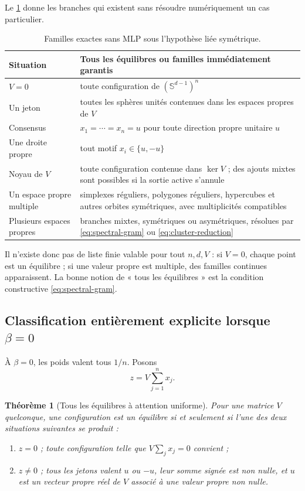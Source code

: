 \documentclass[11pt,a4paper]{article}
\newtheorem{theorem}{Théorème}[section]
\theoremstyle{definition}
\newcommand{\sphere}{\mathbb S}
\begin{document}
Le \cref{tab:families} donne les branches qui existent sans résoudre numériquement un
cas particulier.

\begin{table}[ht]
\centering
\caption{Familles exactes sans MLP sous l'hypothèse liée symétrique.}
\label{tab:families}
\begin{tabularx}{\textwidth}{@{}lX@{}}
\toprule
Situation & Tous les équilibres ou familles immédiatement garantis \\
\midrule
$V=0$ & toute configuration de $(\sphere^{d-1})^n$ \\
Un jeton & toutes les sphères unités contenues dans les espaces propres de $V$ \\
Consensus & $x_1=\cdots=x_n=u$ pour toute direction propre unitaire $u$ \\
Une droite propre & tout motif $x_i\in\{u,-u\}$ \\
Noyau de $V$ & toute configuration contenue dans $\ker V$ ; des ajouts mixtes sont possibles si la sortie active s'annule \\
Un espace propre multiple & simplexes réguliers, polygones réguliers, hypercubes et autres orbites symétriques, avec multiplicités compatibles \\
Plusieurs espaces propres & branches mixtes, symétriques ou asymétriques, résolues par \eqref{eq:spectral-gram} ou \eqref{eq:cluster-reduction} \\
\bottomrule
\end{tabularx}
\end{table}

Il n'existe donc pas de liste finie valable pour tout $n,d,V$ : si $V=0$, chaque point
est un équilibre ; si une valeur propre est multiple, des familles continues apparaissent.
La bonne notion de « tous les équilibres » est la condition constructive
\eqref{eq:spectral-gram}.

\subsection{Classification entièrement explicite lorsque \texorpdfstring{$\beta=0$}{bêta = 0}}

À $\beta=0$, les poids valent tous $1/n$. Posons
\[
 z=V\sum_{j=1}^n x_j.
\]

\begin{theorem}[Tous les équilibres à attention uniforme]
\label{thm:beta-zero}
Pour une matrice $V$ quelconque, une configuration est un équilibre si et seulement si
l'une des deux situations suivantes se produit :
\begin{enumerate}
  \item $z=0$ ; toute configuration telle que $V\sum_jx_j=0$ convient ;
  \item $z\neq0$ ; tous les jetons valent $u$ ou $-u$, leur somme signée est non nulle,
  et $u$ est un vecteur propre réel de $V$ associé à une valeur propre non nulle.
\end{enumerate}
\end{theorem}
\end{document}
